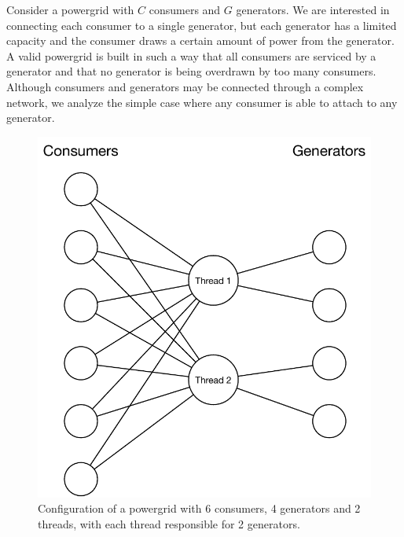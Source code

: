 Consider a powergrid with $C$ consumers and $G$ generators. We are interested
in connecting each consumer to a single generator, but each generator has a
limited capacity and the consumer draws a certain amount of power from the
generator. A valid powergrid is built in such a way that all consumers are
serviced by a generator and that no generator is being overdrawn by too many
consumers. Although consumers and generators may be connected through a complex
network, we analyze the simple case where any consumer is able to attach to any
generator.

\begin{figure}
   \begin{center}
      \includegraphics[width=1\linewidth]{figures/threads/powergrid.pdf}
   \end{center}
   \caption{Configuration of a powergrid with 6 consumers, 4
      generators and 2 threads, with each thread responsible for 2 generators.}
   \label{fig:threads:powergrid}
\end{figure}

